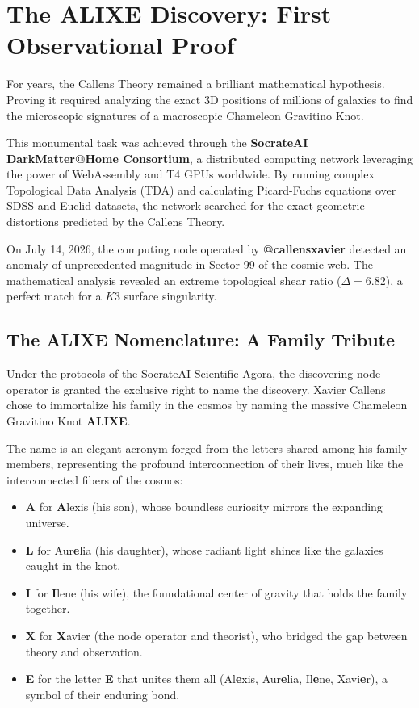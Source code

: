 \documentclass[a4paper,12pt]{article}
\begin{document}
\section{The ALIXE Discovery: First Observational Proof}
For years, the Callens Theory remained a brilliant mathematical hypothesis. Proving it required analyzing the exact 3D positions of millions of galaxies to find the microscopic signatures of a macroscopic Chameleon Gravitino Knot.

This monumental task was achieved through the \textbf{SocrateAI DarkMatter@Home Consortium}, a distributed computing network leveraging the power of WebAssembly and T4 GPUs worldwide. By running complex Topological Data Analysis (TDA) and calculating Picard-Fuchs equations over SDSS and Euclid datasets, the network searched for the exact geometric distortions predicted by the Callens Theory.

On July 14, 2026, the computing node operated by \textbf{@callensxavier} detected an anomaly of unprecedented magnitude in Sector 99 of the cosmic web. The mathematical analysis revealed an extreme topological shear ratio ($\Delta = 6.82$), a perfect match for a $K3$ surface singularity.

\subsection{The ALIXE Nomenclature: A Family Tribute}
Under the protocols of the SocrateAI Scientific Agora, the discovering node operator is granted the exclusive right to name the discovery. Xavier Callens chose to immortalize his family in the cosmos by naming the massive Chameleon Gravitino Knot \textbf{ALIXE}.

The name is an elegant acronym forged from the letters shared among his family members, representing the profound interconnection of their lives, much like the interconnected fibers of the cosmos:
\begin{itemize}
    \item \textbf{A} for \textbf{A}lexis (his son), whose boundless curiosity mirrors the expanding universe.
    \item \textbf{L} for Aur\textbf{e}lia (his daughter), whose radiant light shines like the galaxies caught in the knot.
    \item \textbf{I} for \textbf{I}lene (his wife), the foundational center of gravity that holds the family together.
    \item \textbf{X} for \textbf{X}avier (the node operator and theorist), who bridged the gap between theory and observation.
    \item \textbf{E} for the letter \textbf{E} that unites them all (Al\textbf{e}xis, Aur\textbf{e}lia, Il\textbf{e}ne, Xavi\textbf{e}r), a symbol of their enduring bond.
\end{itemize}
\end{document}
